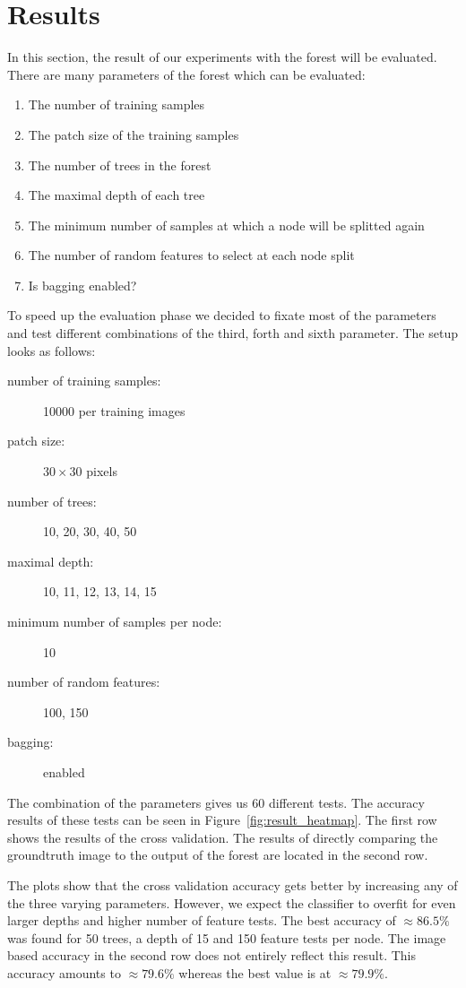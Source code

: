 \section{Results}
\label{sec:results}

In this section, the result of our experiments with the forest will be evaluated. There are many parameters
of the forest which can be evaluated:

\FloatBarrier
\begin{enumerate}
	\item The number of training samples
	\item The patch size of the training samples
	\item The number of trees in the forest
	\item The maximal depth of each tree
	\item The minimum number of samples at which a node will be splitted again
	\item The number of random features to select at each node split
	\item Is bagging enabled?
\end{enumerate}
\FloatBarrier

To speed up the evaluation phase we decided to fixate most of the parameters and test different combinations
of the third, forth and sixth parameter. The setup looks as follows:

\FloatBarrier
\begin{description}
	\item[number of training samples:] 10000 per training images
	\item[patch size:] $30 \times 30$ pixels
	\item[number of trees:] 10, 20, 30, 40, 50
	\item[maximal depth:] 10, 11, 12, 13, 14, 15
	\item[minimum number of samples per node:] 10
	\item[number of random features:] 100, 150
	\item[bagging:] enabled
\end{description}
\FloatBarrier

The combination of the parameters gives us 60 different tests. The accuracy results of these tests can be seen
in Figure~\ref{fig:result_heatmap}. The first row shows the results of the cross validation. The results
of directly comparing the groundtruth image to the output of the forest are located in the second row. 

The plots show that the cross validation accuracy gets better by increasing any of the three varying parameters.
However, we expect the classifier to overfit for even larger depths and higher number of feature tests. The best
accuracy of $\approx 86.5\%$ was found for 50 trees, a depth of 15 and 150 feature tests per node. The image based
accuracy in the second row does not entirely reflect this result. This accuracy amounts to $\approx 79.6\%$ whereas
the best value is at $\approx 79.9\%$.


